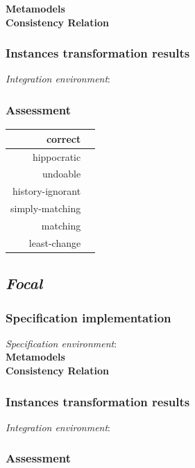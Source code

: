 \documentclass{article}
\begin{document}
\textbf{Metamodels}
~\\

\textbf{Consistency Relation}


\subsubsection{Instances transformation results}
\textit{Integration environment}:
~\\



\subsubsection{Assessment}

\begin{center}
\begin{tabular}{| r | c |}
  \hline                        
  correct & \\
  \hline
  hippocratic & \\
  \hline 
  undoable & \\
  \hline 
  history-ignorant & \\
  \hline 
  simply-matching & \\
  \hline 
  matching & \\
  \hline 
  least-change & \\
  \hline   
\end{tabular}
\end{center}

\pagebreak
\subsection{\textit{Focal}}
\subsubsection{Specification implementation}
\textit{Specification environment}:
~\\

\textbf{Metamodels}
~\\

\textbf{Consistency Relation}
\subsubsection{Instances transformation results}
\textit{Integration environment}:
~\\


\subsubsection{Assessment}
\end{document}
